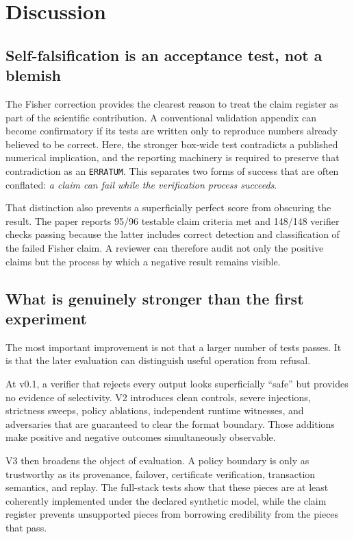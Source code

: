 \documentclass[11pt]{article}
\begin{document}
\section{Discussion}

\subsection{Self-falsification is an acceptance test, not a blemish}

The Fisher correction provides the clearest reason to treat the claim register as part of the scientific contribution. A conventional validation appendix can become confirmatory if its tests are written only to reproduce numbers already believed to be correct. Here, the stronger box-wide test contradicts a published numerical implication, and the reporting machinery is required to preserve that contradiction as an \texttt{ERRATUM}. This separates two forms of success that are often conflated: \emph{a claim can fail while the verification process succeeds}.

That distinction also prevents a superficially perfect score from obscuring the result. The paper reports 95/96 testable claim criteria met and 148/148 verifier checks passing because the latter includes correct detection and classification of the failed Fisher claim. A reviewer can therefore audit not only the positive claims but the process by which a negative result remains visible.

\subsection{What is genuinely stronger than the first experiment}

The most important improvement is not that a larger number of tests passes. It is that the later evaluation can distinguish useful operation from refusal.

At v0.1, a verifier that rejects every output looks superficially ``safe'' but provides no evidence of selectivity. V2 introduces clean controls, severe injections, strictness sweeps, policy ablations, independent runtime witnesses, and adversaries that are guaranteed to clear the format boundary. Those additions make positive and negative outcomes simultaneously observable.

V3 then broadens the object of evaluation. A policy boundary is only as trustworthy as its provenance, failover, certificate verification, transaction semantics, and replay. The full-stack tests show that these pieces are at least coherently implemented under the declared synthetic model, while the claim register prevents unsupported pieces from borrowing credibility from the pieces that pass.
\end{document}
